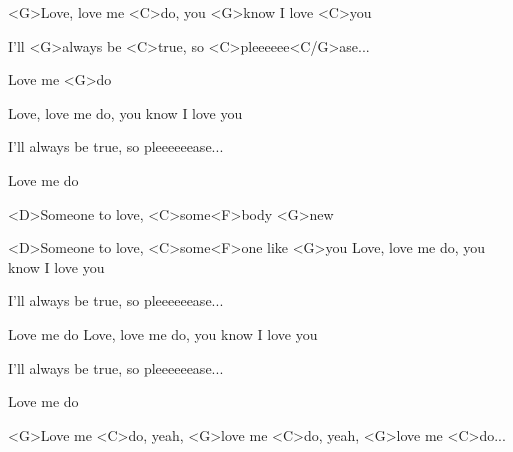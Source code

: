 
\zs

<G>Love, love me <C>do,
you <G>know I love <C>you

I'll <G>always be <C>true,
so <C>pleeeeee<C/G>ase...

Love me <G>do
\ks

\zs
Love, love me do,
you know I love you

I'll always be true,
so pleeeeeease...

Love me do
\ks
\zr

<D>Someone to love, <C>some<F>body <G>new

<D>Someone to love, <C>some<F>one like <G>you
\kr
\zs
Love, love me do,
you know I love you

I'll always be true,
so pleeeeeease...

Love me do
\ks
\zs
Love, love me do,
you know I love you

I'll always be true,
so pleeeeeease...

Love me do
\ks


<G>Love me <C>do, yeah, <G>love me <C>do,
yeah, <G>love me <C>do...

\kp





